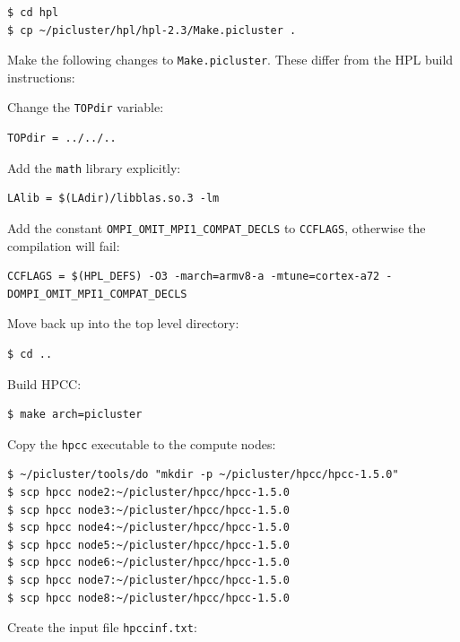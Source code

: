 \documentclass{report}
\begin{document}
\lstset{style=type}
\begin{lstlisting}
$ cd hpl
$ cp ~/picluster/hpl/hpl-2.3/Make.picluster .
\end{lstlisting}

Make the following changes to \verb|Make.picluster|. These differ from the HPL build instructions:

Change the \verb|TOPdir| variable:

\lstset{style=hack}
\begin{lstlisting}[caption=Make.picluster]
TOPdir = ../../..
\end{lstlisting}

Add the \verb|math| library explicitly:

\lstset{style=hack}
\begin{lstlisting}[caption=Make.picluster]
LAlib = $(LAdir)/libblas.so.3 -lm
\end{lstlisting}

Add the constant \verb|OMPI_OMIT_MPI1_COMPAT_DECLS| to \verb|CCFLAGS|, otherwise the compilation will fail:

\lstset{style=hack}
\begin{lstlisting}[caption=Make.picluster]
CCFLAGS = $(HPL_DEFS) -O3 -march=armv8-a -mtune=cortex-a72 -DOMPI_OMIT_MPI1_COMPAT_DECLS
\end{lstlisting}

Move back up into the top level directory:

\lstset{style=type}
\begin{lstlisting}
$ cd ..
\end{lstlisting}

Build HPCC:

\lstset{style=type}
\begin{lstlisting}
$ make arch=picluster
\end{lstlisting}

Copy the \verb|hpcc| executable to the compute nodes:

\lstset{style=type}
\begin{lstlisting}
$ ~/picluster/tools/do "mkdir -p ~/picluster/hpcc/hpcc-1.5.0"
$ scp hpcc node2:~/picluster/hpcc/hpcc-1.5.0
$ scp hpcc node3:~/picluster/hpcc/hpcc-1.5.0
$ scp hpcc node4:~/picluster/hpcc/hpcc-1.5.0
$ scp hpcc node5:~/picluster/hpcc/hpcc-1.5.0
$ scp hpcc node6:~/picluster/hpcc/hpcc-1.5.0
$ scp hpcc node7:~/picluster/hpcc/hpcc-1.5.0
$ scp hpcc node8:~/picluster/hpcc/hpcc-1.5.0
\end{lstlisting}

Create the input file \verb|hpccinf.txt|:
\end{document}
